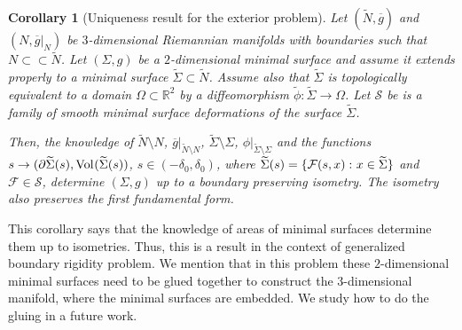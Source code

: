 \documentclass[12pt]{amsart}
\def\p{\partial}
\def\R{\mathbb R}
\newtheorem{corollary}[theorem]{Corollary}
\theoremstyle{definition}
\theoremstyle{remark}
\newcommand{\eps}{\epsilon}
\newcommand{\s}{\hspace{0.5pt}}
\begin{document}
% 
% 

\begin{corollary}[Uniqueness result for the exterior problem]\label{cor:exterior_problem}
Let $(\widetilde N,\overline g)$ and $(N, \overline g|_N)$ be $3$-dimensional Riemannian manifolds with boundaries such that $N \subset\subset \widetilde N$.
Let $(\Sigma,g)$ be a $2$-dimensional minimal surface and assume it extends properly to a minimal surface $\widetilde \Sigma \subset \widetilde N$. Assume also that $ \widetilde \Sigma$ is topologically equivalent to a domain $\Omega\subset \R^2$ by a diffeomorphism $ \widetilde \phi: \widetilde \Sigma\to \Omega$. %
Let $\mathcal S$ be  is  a family of smooth  minimal surface  deformations of the surface $\widetilde \Sigma$.


Then, the knowledge of $\widetilde N\setminus N$, $\overline g|_{\widetilde N\setminus N}$, $\widetilde \Sigma\setminus \Sigma$, $\phi|_{\widetilde \Sigma\setminus \Sigma}$ and the functions $s\to (\partial \widetilde \Sigma(s),
\hbox{Vol}\s (\widetilde \Sigma(s))$, $s\in (-\delta_0,\delta_0)$, where  $\widetilde \Sigma(s)=\{\mathcal F(s,x):\s x\in \widetilde \Sigma\}$ and
$\mathcal F \in \mathcal S$,
determine 
  $(\Sigma,g)$ up to a boundary preserving isometry. The isometry also preserves the first fundamental form.
\end{corollary}
This corollary says that the knowledge of areas of minimal surfaces determine
them up to isometries. Thus, this is a result in the context of generalized
boundary rigidity problem. We mention that in this problem these $2$-dimensional minimal %
surfaces need to be glued together to construct the $3$-dimensional manifold, where the minimal surfaces are embedded.  We study how to do the gluing
in a future work.
\end{document}
